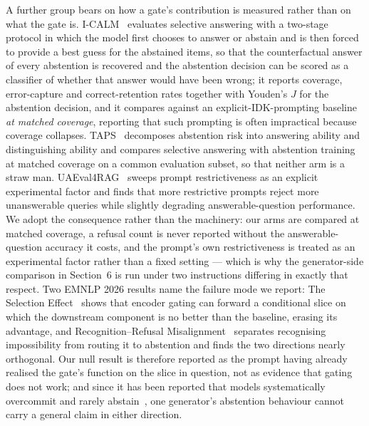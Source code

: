 \documentclass[preprint,3p,times]{elsarticle}
\begin{document}
A further group bears on how a gate's contribution is measured rather than on
what the gate is. I-CALM~\cite{zong2026icalm} evaluates selective answering
with a two-stage protocol in which the model first chooses to answer or
abstain and is then forced to provide a best guess for the abstained items, so
that the counterfactual answer of every abstention is recovered and the
abstention decision can be scored as a classifier of whether that answer would
have been wrong; it reports coverage, error-capture and correct-retention
rates together with Youden's $J$ for the abstention decision, and it compares
against an explicit-IDK-prompting baseline \emph{at matched coverage},
reporting that such prompting is often impractical because coverage collapses.
TAPS~\cite{zhang2026taps} decomposes abstention risk into answering ability
and distinguishing ability and compares selective answering with abstention
training at matched coverage on a common evaluation subset, so that neither
arm is a straw man. UAEval4RAG~\cite{peng2025uaeval4rag} sweeps prompt
restrictiveness as an explicit experimental factor and finds that more
restrictive prompts reject more unanswerable queries while slightly degrading
answerable-question performance. We adopt the consequence rather than the
machinery: our arms are compared at matched coverage, a refusal count is never
reported without the answerable-question accuracy it costs, and the prompt's
own restrictiveness is treated as an experimental factor rather than a fixed
setting --- which is why the generator-side comparison in Section~6 is run
under two instructions differing in exactly that respect. Two EMNLP 2026
results name the failure mode we report: The Selection
Effect~\cite{tikhomirov2026selection} shows that encoder gating can forward a
conditional slice on which the downstream component is no better than the
baseline, erasing its advantage, and Recognition--Refusal
Misalignment~\cite{du2026recognition} separates recognising impossibility from
routing it to abstention and finds the two directions nearly orthogonal. Our
null result is therefore reported as the prompt having already realised the
gate's function on the slice in question, not as evidence that gating does not
work; and since it has been reported that models systematically overcommit and
rarely abstain~\cite{cocchieri2026overcommit}, one generator's abstention
behaviour cannot carry a general claim in either direction.
\end{document}
